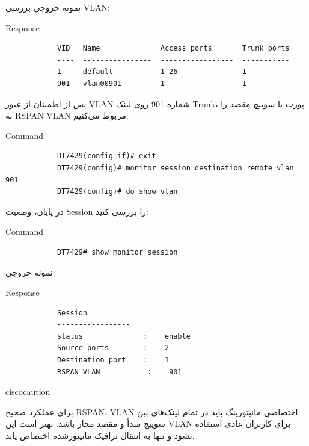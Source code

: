 \documentclass[11pt,letterpaper]{report}
\newenvironment{cautionbox}[1]{%
	\begin{noticebox}[title={\textbf{\faExclamationTriangle\ #1}}]{ciscocaution}
	}{%
	\end{noticebox}
}
\begin{document}
	نمونه خروجی بررسی VLAN:

	\begin{latin}
		\begin{cliexample}{Response}
			\begin{verbatim}
			VID   Name              Access_ports       Trunk_ports
			----  ----------------  -----------------  -----------
			1     default           1-26               1
			901   vlan00901         1                  1
			\end{verbatim}
		\end{cliexample}
	\end{latin}

	پس از اطمینان از عبور VLAN شماره 901 روی لینک Trunk، پورت یا
	سوییچ مقصد را به RSPAN VLAN مربوط می‌کنیم:

	\begin{latin}
		\begin{cliexample}{Command}
			\begin{verbatim}
			DT7429(config-if)# exit
			DT7429(config)# monitor session destination remote vlan 901
			DT7429(config)# do show vlan
			\end{verbatim}
		\end{cliexample}
	\end{latin}

	در پایان، وضعیت Session را بررسی کنید:

	\begin{latin}
		\begin{cliexample}{Command}
			\begin{verbatim}
			DT7429# show monitor session
			\end{verbatim}
		\end{cliexample}
	\end{latin}

	نمونه خروجی:

	\begin{latin}
		\begin{cliexample}{Response}
			\begin{verbatim}
			Session
			-----------------
			status              :    enable
			Source ports        :    2
			Destination port    :    1
			RSPAN VLAN           :    901
			\end{verbatim}
		\end{cliexample}
	\end{latin}

	\begin{cautionbox}{ملاحظات RSPAN}
		برای عملکرد صحیح RSPAN، VLAN اختصاصی مانیتورینگ باید در تمام
		لینک‌های بین سوییچ مبدأ و مقصد مجاز باشد. بهتر است این VLAN
		برای کاربران عادی استفاده نشود و تنها به انتقال ترافیک
		مانیتور‌شده اختصاص یابد.
	\end{cautionbox}
\end{document}

